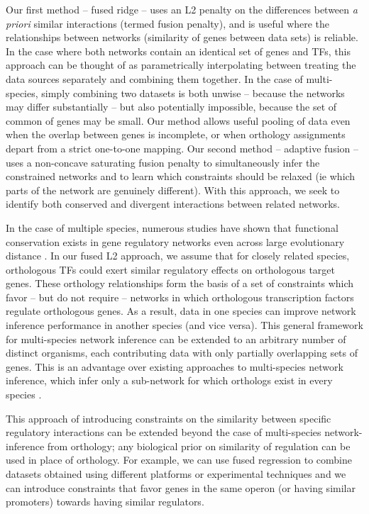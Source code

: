 \documentclass[11pt]{article}
\begin{document}
Our first method -- fused ridge -- uses an L2 penalty on the differences between \textit{a priori} similar interactions (termed fusion penalty), and is useful where the relationships between networks (similarity of genes between data sets) is reliable. 
In the case where both networks contain an identical set of genes and TFs, this approach can be thought of as parametrically interpolating between treating the data sources separately and combining them together. 
In the case of multi-species, simply combining two datasets is both unwise -- because the networks may differ substantially -- but also potentially impossible, because the set of common of genes may be small. 
Our method allows useful pooling of data even when the overlap between genes is incomplete, or when orthology assignments depart from a strict one-to-one mapping. Our second method -- adaptive fusion -- uses a non-concave saturating fusion penalty to simultaneously infer the constrained networks and to learn which constraints should be relaxed (ie which parts of the network are genuinely different). 
With this approach, we seek to identify both conserved and divergent interactions between related networks.

In the case of multiple species, numerous studies have shown that functional conservation exists in gene regulatory networks even across large evolutionary distance \cite{satou2006gene, hinman2009evolution,tanay2005conservation,erwin2009evolution}. 
In our fused L2 approach, we assume that for closely related species, orthologous TFs could exert similar regulatory effects on orthologous target genes. 
These orthology relationships form the basis of a set of constraints which favor -- but do not require -- networks in which orthologous transcription factors regulate orthologous genes. As a result, data in one species can improve network inference performance in another species  (and vice versa). 
This general framework for multi-species network inference can be extended to an arbitrary number of distinct organisms, each contributing data with only partially overlapping sets of genes. 
This is an advantage over existing approaches to multi-species network inference, which infer only a sub-network for which orthologs exist in every species \cite{joshi_multi-species_2015}. 

This approach of introducing constraints on the similarity between specific regulatory interactions can be extended beyond the case of multi-species network-inference from orthology; any biological prior on similarity of regulation can be used in place of orthology. 
For example, we can use fused regression to combine datasets obtained using different platforms or experimental techniques and we can introduce constraints that favor genes in the same operon (or having similar promoters) towards having similar regulators.
\end{document}

